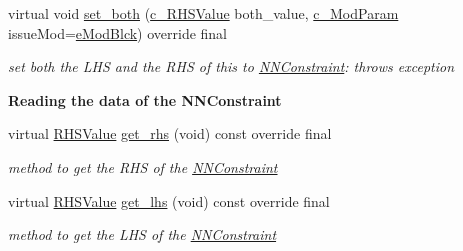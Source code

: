 \begin{Indent}
\begin{DoxyCompactItemize}
virtual void \mbox{\hyperlink{class_s_m_spp__di__unipi__it_1_1_n_n_constraint_aca9b52dad8cd2c7a830d2ebfe0ac31f3}{set\+\_\+both}} (\mbox{\hyperlink{class_s_m_spp__di__unipi__it_1_1_row_constraint_a34abd4b01d3a2024be5f6d13dd88779f}{c\+\_\+\+R\+H\+S\+Value}} both\+\_\+value, \mbox{\hyperlink{group___modification___t_y_p_e_s_ga544246d8c462e9a2d817c2c30797968f}{c\+\_\+\+Mod\+Param}} issue\+Mod=\mbox{\hyperlink{group___modification___t_y_p_e_s_gga48fddcdd03a03f49b7e389ca1ed938d4a21b14b26b1c0093a0905f6fc010bad29}{e\+Mod\+Blck}}) override final
\begin{DoxyCompactList}\small\item\em set both the L\+HS and the R\+HS of this to \mbox{\hyperlink{class_s_m_spp__di__unipi__it_1_1_n_n_constraint}{N\+N\+Constraint}}\+: throws exception \end{DoxyCompactList}\end{DoxyCompactItemize}
\end{Indent}
\begin{Indent}\textbf{ Reading the data of the N\+N\+Constraint}\par
\begin{DoxyCompactItemize}
\item 
\mbox{\label{class_s_m_spp__di__unipi__it_1_1_n_n_constraint_a492119664a2167a60aa99a4ad1146b03}} 
virtual \mbox{\hyperlink{class_s_m_spp__di__unipi__it_1_1_row_constraint_a8813536ab3b13a81c8e83a999ade3bd8}{R\+H\+S\+Value}} \mbox{\hyperlink{class_s_m_spp__di__unipi__it_1_1_n_n_constraint_a492119664a2167a60aa99a4ad1146b03}{get\+\_\+rhs}} (void) const override final
\begin{DoxyCompactList}\small\item\em method to get the R\+HS of the \mbox{\hyperlink{class_s_m_spp__di__unipi__it_1_1_n_n_constraint}{N\+N\+Constraint}} \end{DoxyCompactList}\item 
\mbox{\label{class_s_m_spp__di__unipi__it_1_1_n_n_constraint_ae3f29ca01d997a48a1b842f66f718ca2}} 
virtual \mbox{\hyperlink{class_s_m_spp__di__unipi__it_1_1_row_constraint_a8813536ab3b13a81c8e83a999ade3bd8}{R\+H\+S\+Value}} \mbox{\hyperlink{class_s_m_spp__di__unipi__it_1_1_n_n_constraint_ae3f29ca01d997a48a1b842f66f718ca2}{get\+\_\+lhs}} (void) const override final
\begin{DoxyCompactList}\small\item\em method to get the L\+HS of the \mbox{\hyperlink{class_s_m_spp__di__unipi__it_1_1_n_n_constraint}{N\+N\+Constraint}} \end{DoxyCompactList}\end{DoxyCompactItemize}
\end{Indent}
